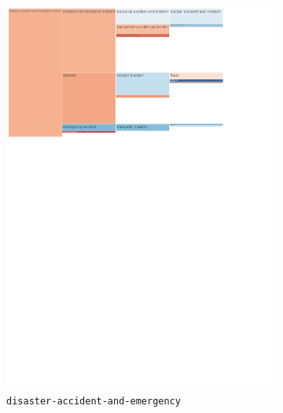 \begin{figure}[!htbp]
{\begin{subfigure}{0.49\textwidth}
		\includegraphics[trim={0.15cm 19.5cm 5cm 0.15cm},clip,width=\linewidth]{figures/baly_iptc_weighted_prop_total_leaning_diff_zoom_disaster.pdf}
		\caption{\texttt{disaster-accident-and-emergency}}
            \label{fig:baly_iptc_weighted_prop_total_leaning_diff_zoom_disaster}
	\end{subfigure}
	\begin{subfigure}{0.49\textwidth}

\end{subfigure}}
\end{figure}
